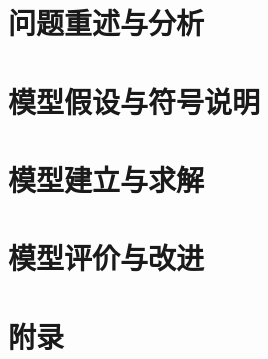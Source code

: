 \documentclass[12pt,a4paper]{ctexart}
\title{}
\author{}
\date{}
\begin{document}

\maketitle



\section{问题重述与分析}

\section{模型假设与符号说明}

\section{模型建立与求解}

\section{模型评价与改进}




\section*{附录}
\end{document}
